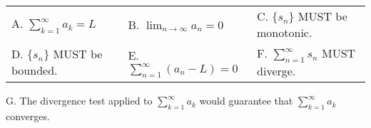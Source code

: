 \documentclass[12pt]{article}
\begin{document}
\begin{tabular}{lll}
A. $ \displaystyle \sum^{\infty}_{k=1} a_k = L $ & B. $\displaystyle \lim_{n \rightarrow \infty} a_n = 0$  \qquad \qquad   & C. $\{ s_n \}$ MUST be monotonic. \qquad  \qquad  \\ [5ex] 
D. $\{ s_n \}$ MUST be bounded. & E. $\displaystyle \sum^{\infty}_{n=1} (a_n-L) = 0$ \qquad \qquad &F.  $\displaystyle \sum^{\infty}_{n=1} s_n$ MUST diverge. \qquad  \qquad 
\end{tabular}

\vspace{1mm}

\hspace{.5mm} G. The divergence test applied to $\displaystyle \sum^{\infty}_{k= 1} a_k$ would guarantee that $\displaystyle \sum^{\infty}_{k=1} a_k$ converges.
%
%
%
%
%
%
%
%
%
%
%
\end{document}
